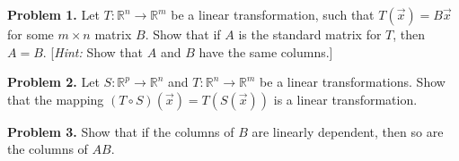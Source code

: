 \documentclass[11pt]{article}
\begin{document}

\bigskip


\bigskip

{\bf Problem 1.} Let $T: \mathbb{R}^n \rightarrow \mathbb{R}^m$ be a linear transformation, such that $T(\vec{x}) = B\vec{x}$ for some $m \times n$ matrix $B$. Show that if $A$ is the standard matrix for $T$, then $A=B$. [{\it{Hint:}} Show that $A$ and $B$ have the same columns.]

\bigskip
\bigskip
\bigskip
\bigskip
\bigskip
\bigskip
\bigskip
\bigskip
\bigskip
\bigskip
\bigskip
\bigskip

{\bf Problem 2.}
Let $S: \mathbb{R}^p \rightarrow \mathbb{R}^n$  and $T: \mathbb{R}^n \rightarrow \mathbb{R}^m$ be a linear transformations. Show that the mapping $(T \circ S )(\vec{x}) = T(S(\vec{x}))$ is a linear transformation. 


\bigskip
\bigskip
\bigskip
\bigskip
\bigskip
\bigskip
\bigskip
\bigskip
\bigskip
\bigskip
\bigskip
\bigskip

{\bf Problem 3.} Show that if the columns of $B$ are linearly dependent, then so are the columns of $AB$.
\end{document}
